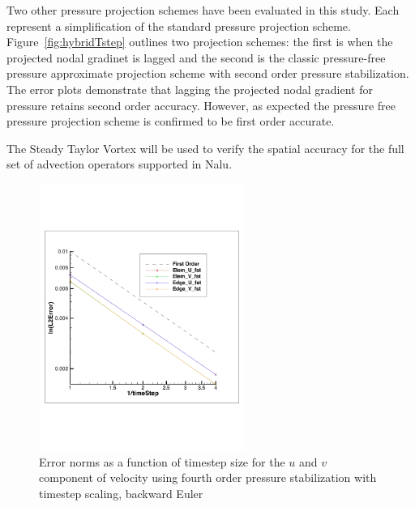 Two other pressure projection schemes have been evaluated in this study. Each represent a 
simplification of the standard pressure projection scheme. Figure~\ref{fig:hybridTstep} outlines
two projection schemes: the first is when the projected nodal gradinet is lagged and the 
second is the classic pressure-free pressure approximate projection scheme with second
order pressure stabilization. The error plots demonstrate that lagging the projected nodal
gradient for pressure retains second order accuracy. However, as expected the pressure
free pressure projection scheme is confirmed to be first order accurate.

The Steady Taylor Vortex will be used to verify the spatial accuracy for the full set of advection
operators supported in Nalu.
 
\begin{figure}
\centerline{\includegraphics[width=0.6\textwidth]{figures/convTaylorVortexFO.pdf}}
\caption{Error norms as a function of timestep size for the $u$ and $v$
component of velocity using fourth order pressure stabilization with timestep scaling, backward Euler}
\label{fig:fo4thTstep}
\end{figure}

